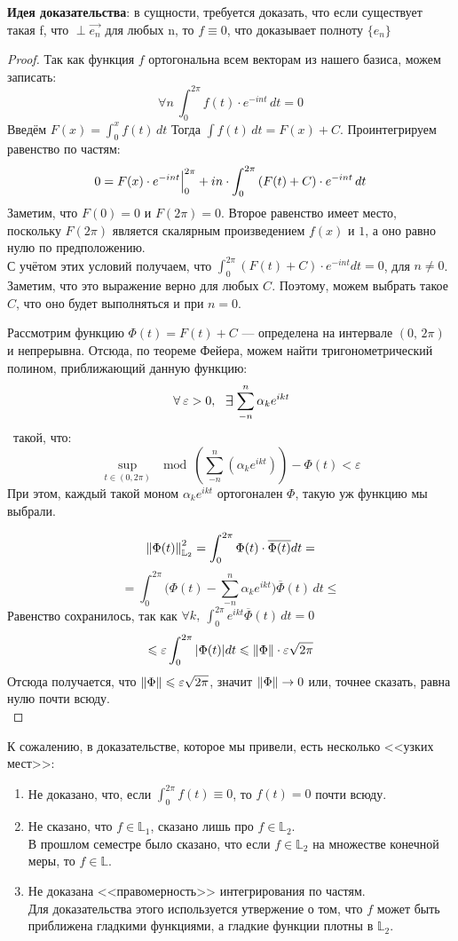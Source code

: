 \documentclass[12pt]{article}
\begin{document}
			\textbf{Идея доказательства}: в сущности, требуется доказать, что если существует такая f, что
			$\perp \vec{e_n}$
			для любых n, то $f \equiv 0$, что доказывает полноту $\{ e_n \}$
			\begin{proof}
				Так как функция $f$ ортогональна всем векторам из нашего базиса, можем записать:
				$$ \forall n ~ \int_0^{2\pi} f(t) \cdot e^{-int} \,dt = 0 $$
				Введём $F(x) = \int_0^x f(t) \,dt$ Тогда $\int f(t) \,dt = F(x) + C$. Проинтегрируем равенство по частям:
				$$ 0 = F(x) \cdot e^{-int} \Big|_{0}^{2\pi} 
			   + i n \cdot \int_0^{2\pi} \left(F(t) + C\right) \cdot e^{-int} \,dt $$
				Заметим, что $F(0) = 0$ и $F(2\pi) = 0$. Второе равенство имеет место, поскольку $F(2\pi)$ является 
			    скалярным произведением $f(x)$ и $1$, а оно равно нулю по предположению. \\
				С учётом этих условий получаем, что $\int_0^{2\pi} (F(t) + C) \cdot e^{-int} dt = 0$, для $n \neq 0$.
				Заметим, что это выражение верно для любых $C$. Поэтому, можем выбрать такое $C$, что оно будет
				выполняться и при $n = 0$.

				Рассмотрим функцию $\Phi(t) = F(t) + C$ --- определена на интервале $(0,\, 2\pi)$ и непрерывна.
				Отсюда, по теореме Фейера, можем найти тригонометрический полином, приближающий данную функцию:
				$$\forall \varepsilon > 0,\, \:\Exists\! \sum_{-n}^n \alpha_k e^{ikt}$$\
				такой, что:
				$$ \underset{t \in (0,2\pi)}{\sup} \mod{(\sum_{-n}^n (\alpha_k e^{ikt})) - \Phi(t)} < \varepsilon $$
				При этом, каждый такой моном $\alpha_k e^{ikt}$ ортогонален $\Phi$, такую уж функцию мы выбрали.
		
				$$ \left\| \Phi(t) \right\|^2_{\mathbb{L}_2} = \int_0^{2\pi} \Phi(t) \cdot \overline{\Phi(t)} dt = $$
				$$ = \int_0^{2\pi}\Big(\Phi(t) - \sum_{-n}^n \alpha_k e^{ikt}\Big)\overline{\Phi}(t) \,dt \leq $$
				\todo{что-то странное, обосновать}
				Равенство сохранилось, так как $\forall k,\: \int_0^{2\pi}e^{ikt}\overline{\Phi}(t) \,dt = 0$
				$$ \leqslant \varepsilon \int_0^{2\pi} | \Phi(t) | dt \leqslant \left\| \Phi \right\| \cdot \varepsilon\sqrt{2\pi} $$
				Отсюда получается, что $\left\| \Phi \right\| \leqslant \varepsilon \sqrt{2\pi}$, значит $\left\| \Phi \right\| \rightarrow 0$ или, точнее сказать,
				равна нулю почти всюду.\\
			\end{proof}
	
			К сожалению, в доказательстве, которое мы привели, есть несколько <<узких мест>>:
			\begin{enumerate}
				\item Не доказано, что, если $\int_0^{2\pi} f(t) \equiv 0$, то $f(t) = 0$ почти всюду.
				\item Не сказано, что $f \in \mathbb{L}_1$, сказано лишь про $f \in \mathbb{L}_2$. \\
				В прошлом семестре было сказано, что если $f \in \mathbb{L}_2$ на множестве конечной меры, то $f \in \mathbb{L}$.
				\item Не доказана <<правомерность>> интегрирования по частям. \\
				Для доказательства этого используется утвержение о том, что $f$ может быть приближена гладкими функциями, а
				гладкие функции плотны в $\mathbb{L}_2$.
			\end{enumerate}
	
\end{document}
